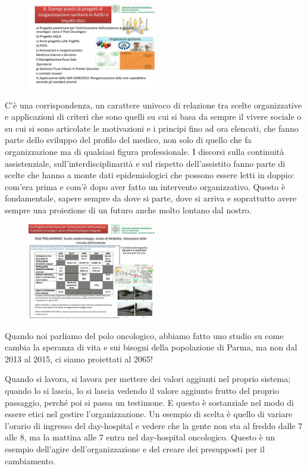  \begin{figure}[!ht]
\centering
	\includegraphics[width=0.5\textwidth]{32/image23.jpeg}
	\end{figure}

C'è una corrispondenza, un carattere univoco di relazione tra scelte
organizzative e applicazioni di criteri che sono quelli su cui si basa
da sempre il vivere sociale o su cui si sono articolate le motivazioni e
i principi fino ad ora elencati, che fanno parte dello sviluppo del
profilo del medico, non solo di quello che fa organizzazione ma di
qualsiasi figura professionale. I discorsi sulla continuità
assistenziale, sull'interdisciplinarità e sul rispetto dell'assistito
fanno parte di scelte che hanno a monte dati epidemiologici che possono
essere letti in doppio: com'era prima e com'è dopo aver fatto un
intervento organizzativo. Questo è fondamentale, sapere sempre da dove
si parte, dove si arriva e soprattutto avere sempre una proiezione di un
futuro anche molto lontano dal nostro.

 \begin{figure}[!ht]
\centering
	\includegraphics[width=0.5\textwidth]{32/image24.jpeg}
	\end{figure}

Quando noi parliamo del polo oncologico, abbiamo fatto uno studio su
come cambia la speranza di vita e sui bisogni della popolazione di
Parma, ma non dal 2013 al 2015, ci siamo proiettati al 2065!

Quando si lavora, si lavora per mettere dei valori aggiunti nel proprio
sistema; quando lo si lascia, lo si lascia vedendo il valore aggiunto
frutto del proprio passaggio, perché poi si passa un testimone. E questo
è sostanziale nel modo di essere etici nel gestire l'organizzazione. Un
esempio di scelta è quello di variare l'orario di ingresso del
day-hospital e vedere che la gente non sta al freddo dalle 7 alle 8, ma
la mattina alle 7 entra nel day-hospital oncologico. Questo è un esempio
dell'agire dell'organizzazione e del creare dei presupposti per il
cambiamento.

